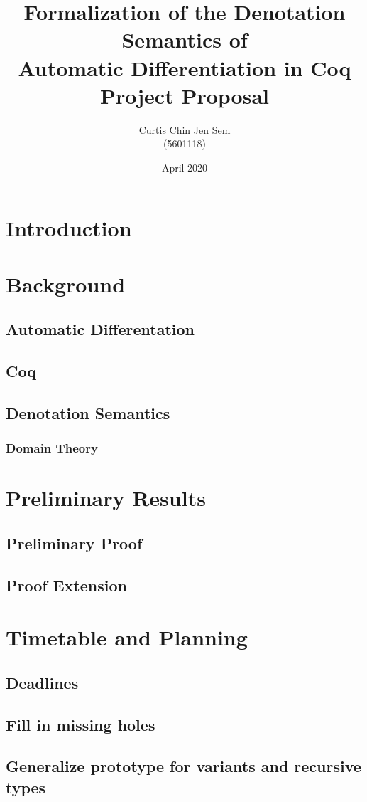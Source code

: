 \documentclass[11pt, letterpaper]{article}
\title{Formalization of the Denotation Semantics of
    \\ Automatic Differentiation in Coq
    \\ Project Proposal
}
\author{Curtis Chin Jen Sem \\ (5601118)}
\date{April 2020}
\begin{document}
\maketitle

\section{Introduction}



\section{Background}

\subsection{Automatic Differentation}

\subsection{Coq}

\subsection{Denotation Semantics}

\subsubsection{Domain Theory}

\section{Preliminary Results}

\subsection{Preliminary Proof}

\subsection{Proof Extension}

\section{Timetable and Planning}

\subsection{Deadlines}
\subsection{Fill in missing holes}
\subsection{Generalize prototype for variants and recursive types}

\printbibliography
\end{document}
